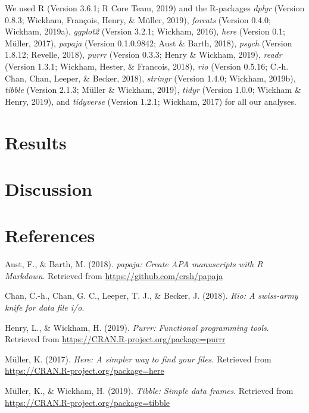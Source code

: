 \documentclass[man]{apa6}
\begin{document}
We used R (Version 3.6.1; R Core Team, 2019) and the R-packages
\emph{dplyr} (Version 0.8.3; Wickham, François, Henry, \& Müller, 2019),
\emph{forcats} (Version 0.4.0; Wickham, 2019a), \emph{ggplot2} (Version
3.2.1; Wickham, 2016), \emph{here} (Version 0.1; Müller, 2017),
\emph{papaja} (Version 0.1.0.9842; Aust \& Barth, 2018), \emph{psych}
(Version 1.8.12; Revelle, 2018), \emph{purrr} (Version 0.3.3; Henry \&
Wickham, 2019), \emph{readr} (Version 1.3.1; Wickham, Hester, \&
Francois, 2018), \emph{rio} (Version 0.5.16; C.-h. Chan, Chan, Leeper,
\& Becker, 2018), \emph{stringr} (Version 1.4.0; Wickham, 2019b),
\emph{tibble} (Version 2.1.3; Müller \& Wickham, 2019), \emph{tidyr}
(Version 1.0.0; Wickham \& Henry, 2019), and \emph{tidyverse} (Version
1.2.1; Wickham, 2017) for all our analyses.

\section{Results}\label{results}

\section{Discussion}\label{discussion}

\newpage

\section{References}\label{references}

\begingroup
\setlength{\parindent}{-0.5in} \setlength{\leftskip}{0.5in}

\hypertarget{refs}{}
\hypertarget{ref-R-papaja}{}
Aust, F., \& Barth, M. (2018). \emph{papaja: Create APA manuscripts with
R Markdown}. Retrieved from \url{https://github.com/crsh/papaja}

\hypertarget{ref-R-rio}{}
Chan, C.-h., Chan, G. C., Leeper, T. J., \& Becker, J. (2018).
\emph{Rio: A swiss-army knife for data file i/o}.

\hypertarget{ref-R-purrr}{}
Henry, L., \& Wickham, H. (2019). \emph{Purrr: Functional programming
tools}. Retrieved from \url{https://CRAN.R-project.org/package=purrr}

\hypertarget{ref-R-here}{}
Müller, K. (2017). \emph{Here: A simpler way to find your files}.
Retrieved from \url{https://CRAN.R-project.org/package=here}

\hypertarget{ref-R-tibble}{}
Müller, K., \& Wickham, H. (2019). \emph{Tibble: Simple data frames}.
Retrieved from \url{https://CRAN.R-project.org/package=tibble}
\end{document}
